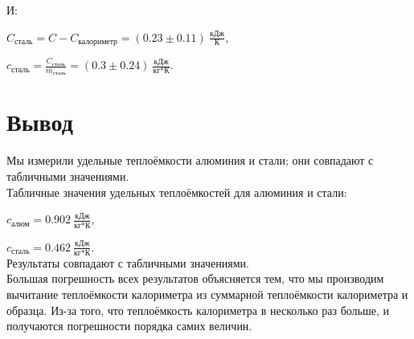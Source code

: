 \documentclass[a4paper]{article}
\begin{document}
    И:

    $C_\text{сталь} = C - C_\text{калориметр} = (0.23 \pm 0.11)~\frac{\text{кДж}}{\text{К}}$,

    $c_\text{сталь} = \frac{C_\text{сталь}}{m_\text{сталь}} = (0.3 \pm 0.24)~\frac{\text{кДж}}{\text{кг*К}}$. \\

\section{Вывод}

Мы измерили удельные теплоёмкости алюминия и стали; они совпадают с табличными значениями. \\

Табличные значения удельных теплоёмкостей для алюминия и стали:

$c_\text{алюм} = 0.902~\frac{\text{кДж}}{\text{кг*К}}$,

$c_\text{сталь} = 0.462~\frac{\text{кДж}}{\text{кг*К}}$. \\

Результаты совпадают с табличными значениями. \\

Большая погрешность всех результатов объясняется тем, что мы производим вычитание теплоёмкости калориметра из суммарной теплоёмкости калориметра и образца. Из-за того, что теплоёмкость калориметра в несколько раз больше, и получаются погрешности порядка самих величин.
\end{document}
